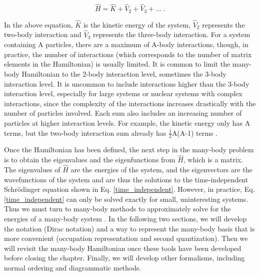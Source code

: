 \begin{equation} \label{hamiltonian}
	\hat{H} = \hat{K} + \hat{V}_2 + \hat{V}_3 + ...\ .
\end{equation}


In the above equation, $\hat{K}$ is the kinetic energy of the system, $\hat{V}_{2}$ represents the two-body interaction and $\hat{V}_3$ represents the three-body interaction. For a system containing A particles, there are a maximum of A-body interactions, though, in practice, the number of interactions (which corresponds to the number of matrix elements in the Hamiltonian) is usually limited. It is common to limit the many-body Hamiltonian to the 2-body interaction level, sometimes the 3-body interaction level. It is uncommon to include interactions higher than the 3-body interaction level, especially for large systems or nuclear systems with complex interactions, since the complexity of the interactions increases drastically with the number of particles involved. Each sum also includes an increasing number of particles at higher interaction levels. For example, the kinetic energy only has A terms, but the two-body interaction sum already has $\frac{1}{2}$A(A-1) terms \cite{Ref13}.

Once the Hamiltonian has been defined, the next step in the many-body problem is to obtain the eigenvalues and the eigenfunctions from $\hat{H}$, which is a matrix. The eigenvalues of $\hat{H}$ are the energies of the system, and the eigenvectors are the wavefunctions of the system and are thus the solutions to the time-independent Schr\"{o}dinger equation shown in Eq. \ref{time_independent}. However, in practice, Eq. \ref{time_independent} can only be solved exactly for small, uninteresting systems. Thus we must turn to many-body methods to approximately solve for the energies of a many-body system \cite{Ref1, Ref3, Ref13}. In the following two sections, we will develop the notation (Dirac notation) and a way to represent the many-body basis that is more convenient (occupation representation and second quantization). Then we will revisit the many-body Hamiltonian once these tools have been developed before closing the chapter. Finally, we will develop other formalisms, including normal ordering and diagrammatic methods.